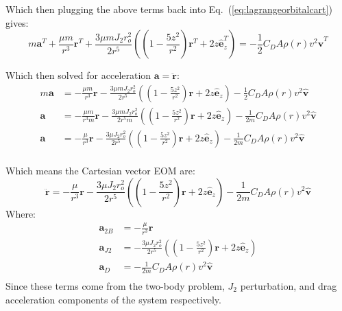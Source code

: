 \documentclass[titlepage]{article}
\begin{document}
Which then plugging the above terms back into Eq.~(\ref{eq:lagrangeorbitalcart}) gives:
\begin{equation}
	m\boldsymbol{a}^T+\frac{\mu m}{r^3}\boldsymbol{r}^T+\frac{3\mu mJ_2r_o^2}{2r^5}\left(\left(1-\frac{5z^2}{r^2}\right)\boldsymbol{r}^T+2z\hat{\boldsymbol{e}}_z^T\right)=-\frac{1}{2}C_DA\rho(r)v^2\hat{\boldsymbol{v}}^T
\end{equation}

Which then solved for acceleration $\boldsymbol{a}=\ddot{\boldsymbol{r}}$:
\begin{equation}
	\begin{split}
		m\boldsymbol{a}&=-\frac{\mu m}{r^3}\boldsymbol{r}-\frac{3\mu mJ_2r_o^2}{2r^5}\left(\left(1-\frac{5z^2}{r^2}\right)\boldsymbol{r}+2z\hat{\boldsymbol{e}}_z\right)-\frac{1}{2}C_DA\rho(r)v^2\hat{\boldsymbol{v}}\\
		\boldsymbol{a}&=-\frac{\mu m}{r^3 m}\boldsymbol{r}-\frac{3\mu mJ_2r_o^2}{2r^5 m}\left(\left(1-\frac{5z^2}{r^2}\right)\boldsymbol{r}+2z\hat{\boldsymbol{e}}_z\right)-\frac{1}{2m}C_DA\rho(r)v^2\hat{\boldsymbol{v}} \\
		\boldsymbol{a}&=-\frac{\mu}{r^3}\boldsymbol{r}-\frac{3\mu J_2r_o^2}{2r^5}\left(\left(1-\frac{5z^2}{r^2}\right)\boldsymbol{r}+2z\hat{\boldsymbol{e}}_z\right)-\frac{1}{2m}C_DA\rho(r)v^2\hat{\boldsymbol{v}} \\
	\end{split}
\end{equation}

\begin{mdframed}[linewidth=1pt, innertopmargin=10pt, innerbottommargin=10pt]
	Which means the Cartesian vector EOM are:
	\begin{equation}
		\ddot{\boldsymbol{r}}=-\frac{\mu}{r^3}\boldsymbol{r}-\frac{3\mu J_2r_o^2}{2r^5}\left(\left(1-\frac{5z^2}{r^2}\right)\boldsymbol{r}+2z\hat{\boldsymbol{e}}_z\right)-\frac{1}{2m}C_DA\rho(r)v^2\hat{\boldsymbol{v}}
	\end{equation}
	Where:
	\begin{equation}
		\begin{split}
			\boldsymbol{a}_{2B}&=-\frac{\mu}{r^3}\boldsymbol{r} \\
			\boldsymbol{a}_{J2}&=-\frac{3\mu J_2r_o^2}{2r^5}\left(\left(1-\frac{5z^2}{r^2}\right)\boldsymbol{r}+2z\hat{\boldsymbol{e}}_z\right) \\
			\boldsymbol{a}_D&=-\frac{1}{2m}C_DA\rho(r)v^2\hat{\boldsymbol{v}} \\
		\end{split}
	\end{equation}
	Since these terms come from the two-body problem, $J_2$ perturbation, and drag acceleration components of the system respectively.
\end{mdframed}
\end{document}
